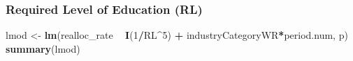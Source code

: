 \documentclass[
]{article}
\newenvironment{Shaded}{\begin{snugshade}}{\end{snugshade}}
\newcommand{\DecValTok}[1]{\textcolor[rgb]{0.00,0.00,0.81}{#1}}
\newcommand{\KeywordTok}[1]{\textcolor[rgb]{0.13,0.29,0.53}{\textbf{#1}}}
\newcommand{\NormalTok}[1]{#1}
\newcommand{\OperatorTok}[1]{\textcolor[rgb]{0.81,0.36,0.00}{\textbf{#1}}}
\newcommand{\StringTok}[1]{\textcolor[rgb]{0.31,0.60,0.02}{#1}}
\begin{document}
\hypertarget{required-level-of-education-rl-1}{%
\subsubsection{Required Level of Education
(RL)}\label{required-level-of-education-rl-1}}

\begin{Shaded}
\begin{Highlighting}[]
\NormalTok{lmod <-}\StringTok{ }\KeywordTok{lm}\NormalTok{(realloc_rate }\OperatorTok{~}\StringTok{ }\KeywordTok{I}\NormalTok{(}\DecValTok{1}\OperatorTok{/}\NormalTok{RL}\OperatorTok{^}\DecValTok{5}\NormalTok{) }\OperatorTok{+}\StringTok{ }\NormalTok{industryCategoryWR}\OperatorTok{*}\NormalTok{period.num, p)}
\KeywordTok{summary}\NormalTok{(lmod)}
\end{Highlighting}
\end{Shaded}
\end{document}
